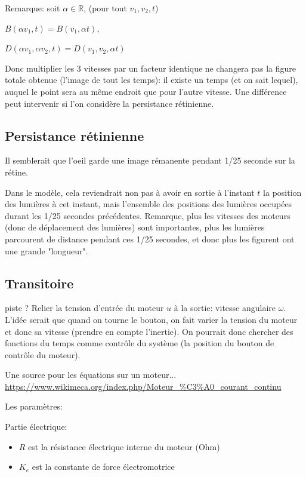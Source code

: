 \documentclass[11pt,a4paper]{article}
\newcommand{\R}{\mathbb R}%
\begin{document}
Remarque: soit $\alpha \in \R$, (pour tout $v_1,v_2,t$)

$B(\alpha v_1,t) = B(v_1,\alpha t)$,

$D(\alpha v_1,\alpha v_2,t) = D(v_1,v_2,\alpha t)$

Donc multiplier les 3 vitesses par un facteur identique ne changera pas la figure totale obtenue (l'image de tout les temps): il existe un temps (et on sait lequel), auquel le point sera au même endroit que pour l'autre vitesse. Une différence peut intervenir si l'on considère la persistance rétinienne.




\subsection{Persistance rétinienne}

Il semblerait que l’oeil garde une image rémanente pendant 1/25 seconde sur la rétine.

Dans le modèle, cela reviendrait non pas à avoir en sortie à l'instant $t$ la position des lumières à cet instant, mais l'ensemble des positions des lumières occupées durant les 1/25 secondes précédentes. Remarque, plus les vitesses des moteurs (donc de déplacement des lumières) sont importantes, plus les lumières parcourent de distance pendant ces 1/25 secondes, et donc plus les figurent ont une grande "longueur".


\subsection{Transitoire}

piste ? Relier la tension d'entrée du moteur $u$ à la sortie: vitesse angulaire $\omega$. L'idée serait que quand on tourne le bouton, on fait varier la tension du moteur et donc sa vitesse (prendre en compte l'inertie). On pourrait donc chercher des fonctions du temps comme contrôle du système (la position du bouton de contrôle du moteur).

Une source pour les équations sur un moteur...
\url{https://www.wikimeca.org/index.php/Moteur_\%C3\%A0_courant_continu}

Les paramètres:

Partie électrique:
\begin{itemize}
\item $R$ est la résistance électrique interne du moteur (Ohm)
\item  $K_e$ est la constante de force électromotrice
\end{itemize}
\end{document}
